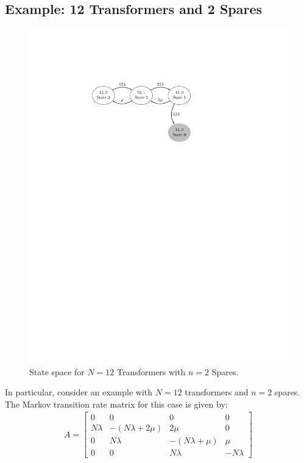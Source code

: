 \documentclass[letterpaper, 12pt]{article}
\begin{document}
\subsection{Example: 12 Transformers and 2 Spares}
\label{sec:TwoSparesExample}
\begin{figure}[h!] \centering
  \includegraphics[scale=0.9]{TwoSparesStateSpace}
  \caption{State space for $N=12$ Transformers with $n=2$ Spares.\label{fig:TwoSparesStateSpace}} 
\end{figure}
In particular, consider an example with $N=12$ transformers and $n=2$ spares. The Markov transition rate matrix for this case is given by:
\begin{align}
A=
\begin{bmatrix}
0	 & 	0	 & 	0	 & 	 0	\\
N\lambda	 & 	-( N\lambda + 2\mu)	 & 	2\mu	 & 	0	\\
0	 & 	N\lambda	 & 	-( N\lambda + \mu)	 & 	\mu	\\
0	 & 	0	 & 	N\lambda	 & 	-N\lambda 
\end{bmatrix}
\end{align}
\end{document}

